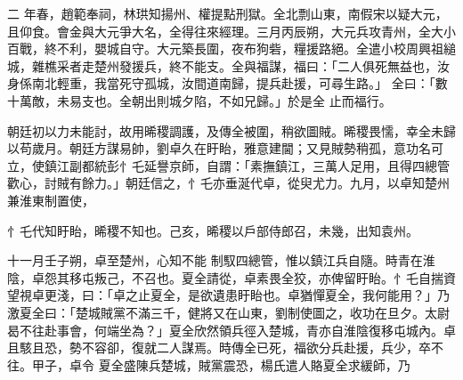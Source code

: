 \begin{pinyinscope}
 二
 年春，趙範奉祠，林珙知揚州、權提點刑獄。全北剽山東，南假宋以疑大元，且仰食。會金與大元爭大名，全得往來經理。三月丙辰朔，大元兵攻青州，全大小百戰，終不利，嬰城自守。大元築長圍，夜布狗砦，糧援路絕。全遣小校周興祖縋城，雜樵采者走楚州發援兵，終不能支。全與福謀，福曰：「二人俱死無益也，汝身係南北輕重，我當死守孤城，汝間道南歸，提兵赴援，可尋生路。」 全曰：「數十萬敵，未易支也。全朝出則城夕陷，不如兄歸。」於是全
 止而福行。



 朝廷初以力未能討，故用晞稷調護，及傳全被圍，稍欲圖賊。晞稷畏懦，幸全未歸以苟歲月。朝廷方謀易帥，劉卓久在盱眙，雅意建閫；又見賊勢稍孤，意功名可立，使鎮江副都統彭忄乇延譽京師，自謂：「素撫鎮江，三萬人足用，且得四總管歡心，討賊有餘力。」朝廷信之，忄乇亦垂涎代卓，從臾尤力。九月，以卓知楚州兼淮東制置使，



 忄乇代知盱眙，晞稷不知也。己亥，晞稷以戶部侍郎召，未幾，出知袁州。



 十一月壬子朔，卓至楚州，心知不能
 制馭四總管，惟以鎮江兵自隨。時青在淮陰，卓怨其移屯叛己，不召也。夏全請從，卓素畏全狡，亦俾留盱眙。忄乇自揣資望視卓更淺，曰：「卓之止夏全，是欲遺患盱眙也。卓猶憚夏全，我何能用？」乃激夏全曰：「楚城賊黨不滿三千，健將又在山東，劉制使圖之，收功在旦夕。太尉曷不往赴事會，何端坐為？」夏全欣然領兵徑入楚城，青亦自淮陰復移屯城內。卓且駭且恐，勢不容卻，復就二人謀焉。時傳全已死，福欲分兵赴援，兵少，卒不往。甲子，卓令
 夏全盛陳兵楚城，賊黨震恐，楊氏遣人賂夏全求緩師，乃



\end{pinyinscope}
